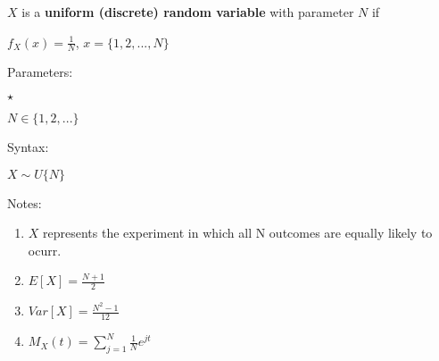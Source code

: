 \documentclass{article}
\begin{document}
$X$ is a \textbf{uniform (discrete) random variable} with parameter \textbf{$N$} if\\
\par
$f_X(x) = \frac{1}{N}$,     $x=\{1,2,...,N\}$	\\
\par
Parameters:\\
\par
\begin{list}{$\star$ }{}
\item $N \in \{1,2,...\}$
\end{list}
\par
Syntax:\\
\par
$X\sim U\{N\}$\\
\par
Notes:\\
\par
\begin{enumerate}

\item $X$ represents the experiment in which all N outcomes are equally likely to ocurr.
\item $E[X] = \frac{N+1}{2}$
\item $Var[X] = \frac{N^2-1}{12}$
\item $M_X(t) = \sum_{j=1}^{N}{\frac{1}{N} e^{jt}}$

\end{enumerate}
\end{document}
